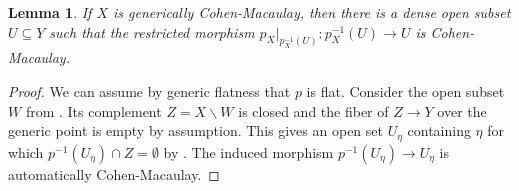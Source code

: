 \documentclass[12pt,reqno,a4paper]{amsart}
\theoremstyle{theoremstyle}
\newtheorem{lemma}[theorem]{Lemma}
\theoremstyle{examplestyle}
\theoremstyle{algorithmstyle}
\begin{document}
\begin{lemma}\label{lem:GenericallyCM}
  If $X$ is generically Cohen-Macaulay, then there is a dense open subset $U\subseteq{Y}$ such that the restricted morphism $p_X|_{p_X^{-1}(U)}\colon p_X^{-1}(U)\to{U}$ is Cohen-Macaulay.
\end{lemma}
\begin{proof}
  We can assume by generic flatness that $p$ is flat. Consider the open subset $W$ from \cite[\href{https://stacks.math.columbia.edu/tag/045U}{Lemma 045U}]{stacks-project}. Its complement $Z=X\backslash{W}$ is closed and the fiber of $Z\to{Y}$ over the generic point is empty by assumption. This gives an open set $U_{\eta}$ containing $\eta$ for which  $p^{-1}(U_{\eta})\cap{Z}=\emptyset$ by \cite[\href{https://stacks.math.columbia.edu/tag/02NE}{Lemma 02NE}]{stacks-project}. The induced morphism $p^{-1}(U_{\eta})\to{U_{\eta}}$ is automatically Cohen-Macaulay.
\end{proof}
\end{document}
